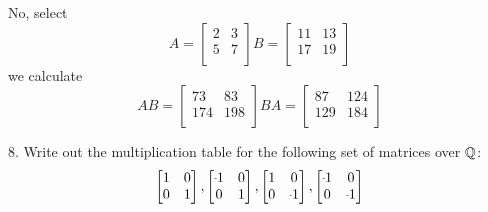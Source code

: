 \begin{mdframed}[style=darkAnswer,frametitle={Joe Starr}]
  No, select $$A=\begin{bmatrix}
  2 & 3 \\
  5 & 7 \\
  \end{bmatrix}
  B=\begin{bmatrix}
  11 & 13 \\
  17 & 19 \\
  \end{bmatrix}$$
  we calculate
  $$AB=\begin{bmatrix}
  73  & 83  \\
  174 & 198 \\
  \end{bmatrix}
  BA=\begin{bmatrix}
  87  & 124 \\
  129 & 184 \\
  \end{bmatrix}$$
\end{mdframed}
\newpage
\begin{mdframed}[style=darkQuesion]
  8. Write out the multiplication table for the following set of matrices over
  $\mathbb{Q}$:
  $$\begin{bmatrix}
  1 & 0 \\
  0 & 1 \\
  \end{bmatrix},
  \begin{bmatrix}
    \m1 & 0 \\
    0   & 1 \\
  \end{bmatrix},
  \begin{bmatrix}
    1 & 0   \\
    0 & \m1 \\
  \end{bmatrix},
  \begin{bmatrix}
    \m1 & 0   \\
    0   & \m1 \\
  \end{bmatrix}$$
    
    
\end{mdframed}

